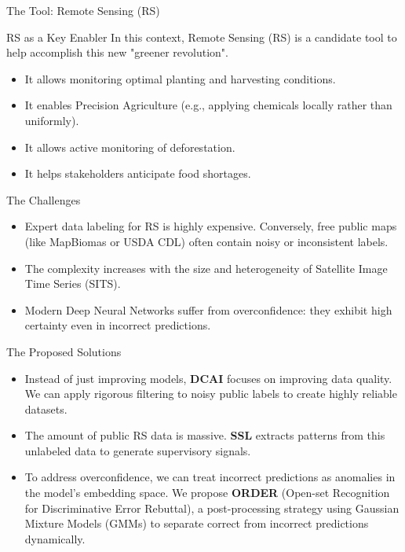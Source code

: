 \begin{frame}{The Tool: Remote Sensing (RS)}
    \begin{block}{RS as a Key Enabler}
        In this context, Remote Sensing (RS) is a candidate tool to help accomplish this new "greener revolution".
        \begin{itemize}
            \pause
            \item It allows monitoring optimal planting and harvesting conditions.
            \pause
            \item It enables Precision Agriculture (e.g., applying chemicals locally rather than uniformly).
            \pause
            \item It allows active monitoring of deforestation.
            \pause
            \item It helps stakeholders anticipate food shortages.
        \end{itemize}
    \end{block}
\end{frame}

\begin{frame}{The Challenges}
    \begin{itemize}
        \item Expert data labeling for RS is highly expensive. Conversely, free public maps (like MapBiomas or USDA CDL) often contain noisy or inconsistent labels.
        \pause
        \item The complexity increases with the size and heterogeneity of Satellite Image Time Series (SITS).
        \pause
        \item Modern Deep Neural Networks suffer from overconfidence: they exhibit high certainty even in incorrect predictions.
    \end{itemize}
\end{frame}

\begin{frame}{The Proposed Solutions}
    \begin{itemize}
        \item Instead of just improving models, \textbf{DCAI} focuses on improving data quality. We can apply rigorous filtering to noisy public labels to create highly reliable datasets.
        \pause
        \item The amount of public RS data is massive. \textbf{SSL} extracts patterns from this unlabeled data to generate supervisory signals.
        \pause
        \item To address overconfidence, we can treat incorrect predictions as anomalies in the model's embedding space. We propose \textbf{ORDER} (Open-set Recognition for Discriminative Error Rebuttal), a post-processing strategy using Gaussian Mixture Models (GMMs) to separate correct from incorrect predictions dynamically.
    \end{itemize}
\end{frame}


